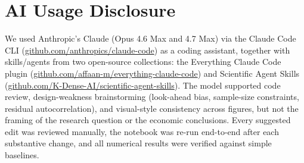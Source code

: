 \documentclass[12pt]{article}
\begin{document}
\section{AI Usage Disclosure}

We used Anthropic's Claude (Opus 4.6 Max and 4.7 Max) via the Claude Code CLI (\href{https://github.com/anthropics/claude-code}{github.com/anthropics/claude-code}) as a coding assistant, together with skills/agents from two open-source collections: the Everything Claude Code plugin (\href{https://github.com/affaan-m/everything-claude-code}{github.com/affaan-m/everything-claude-code}) and Scientific Agent Skills (\href{https://github.com/K-Dense-AI/scientific-agent-skills}{github.com/K-Dense-AI/scientific-agent-skills}). The model supported code review, design-weakness brainstorming (look-ahead bias, sample-size constraints, residual autocorrelation), and visual-style consistency across figures, but not the framing of the research question or the economic conclusions. Every suggested edit was reviewed manually, the notebook was re-run end-to-end after each substantive change, and all numerical results were verified against simple baselines.



\end{document}
